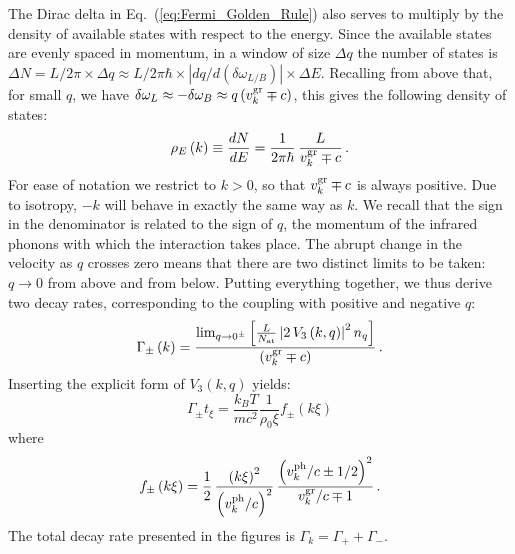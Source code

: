 \documentclass[aps,prd,notitlepage,amsfonts,amssymb,amsmath,nofootinbib,superscriptaddress,longbibliography]{revtex4-2}
\begin{document}
The Dirac delta in Eq.~(\ref{eq:Fermi_Golden_Rule}) also serves to multiply by the density of available states with respect to the energy.
Since the available states are evenly spaced in momentum, in a window of size $\Delta q$ the number of states is $\Delta N = L/2\pi \times \Delta q \approx L/2\pi\hbar \times \left|dq/d\left(\delta \omega_{L/B}\right)\right| \times \Delta E$.  Recalling from above that, for small $q$, we have $\delta \omega_{L} \approx -\delta \omega_{B} \approx q \left(v^{\rm gr}_k \mp c\right)$, this gives the following density of states:
\begin{equation}
    \rho_{E}\left(k\right) \equiv \frac{dN}{dE} = \frac{1}{2\pi\hbar} \, \frac{L}{v^{\rm gr}_k \mp c} \,.
\end{equation}
For ease of notation we restrict to $k > 0$, so that $v^{\rm gr}_k \mp c$ is always positive.  Due to isotropy, $-k$ will behave in exactly the same way as $k$.  We recall that the sign in the denominator is related to the sign of $q$, the momentum of the infrared phonons with which the interaction takes place.  The abrupt change in the velocity as $q$ crosses zero means that there are two distinct limits to be taken: $q \to 0$ from above and from below.  Putting everything together, we thus derive two decay rates, corresponding to the coupling with positive and negative $q$:
\begin{equation}
    \Gamma_{\pm}\left(k\right) = \frac{{\rm lim}_{q \to 0^{\pm}} \left[ \frac{L}{N_{\rm at}} \left|2 \, V_3\left(k,q\right)\right|^{2} n_{q} \right]}{\left(v^{\rm gr}_k \mp c\right)} \,.
\end{equation}
Inserting the explicit form of $V_3\left(k,q\right)$ yields:
\begin{equation}
\label{def:decay_rate}
    \Gamma_{\pm} t_{\xi} = \frac{k_{B}T}{m c^2} \frac{1}{\rho_{0}\xi} f_{\pm}\left(k\xi\right)
\end{equation}
where
\begin{equation}
    f_{\pm}\left(k\xi\right) = \frac{1}{2} \, \frac{\left(k\xi\right)^{2}}{\left(v^{\rm ph}_k/c\right)^{2}} \, \frac{\left(v^{\rm ph}_k/c \pm 1/2\right)^{2}}{v^{\rm gr}_k/c \mp 1} \, .
\end{equation}
The total decay rate presented in the figures is $\Gamma_{k} = \Gamma_{+} + \Gamma_{-} $.
\end{document}
